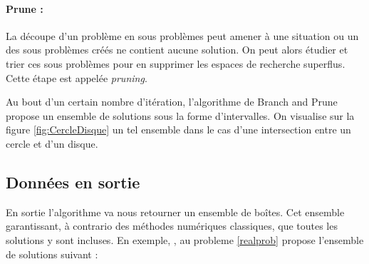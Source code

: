 \paragraph{Prune :}
La découpe d'un problème en sous problèmes peut amener à une situation ou un des sous problèmes créés ne contient aucune solution. On peut alors étudier et trier ces sous problèmes pour en supprimer les espaces de recherche superflus. Cette étape est appelée \emph{pruning}.

Au bout d'un certain nombre d'itération, l'algorithme de Branch and Prune propose un ensemble de solutions sous la forme d'intervalles. On visualise sur la figure \ref{fig:CercleDisque} un tel ensemble dans le cas d'une intersection entre un cercle et d'un disque.





\subsection{Données en sortie}
En sortie l'algorithme va nous retourner un ensemble de boîtes. Cet ensemble garantissant, à contrario des méthodes numériques classiques, que toutes les solutions y sont incluses. En exemple, \realpaver, au  probleme \ref{realprob} propose l'ensemble de solutions suivant : 

